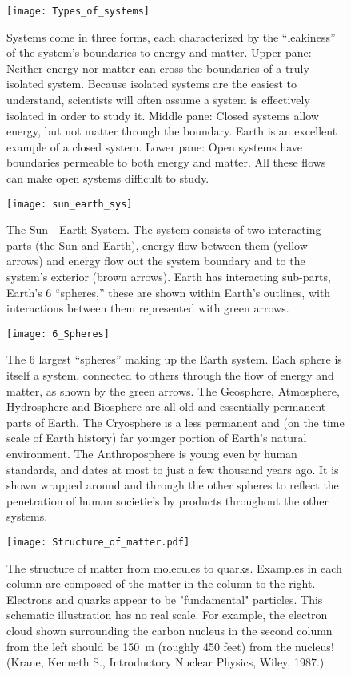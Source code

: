\begin{figure}[p]
\centering
\texttt{[image: Types\_of\_systems]}%
\caption{Systems come in three forms, each characterized by the ``leakiness'' of the system's boundaries to energy and matter. Upper pane: Neither energy nor matter can cross the boundaries of a truly isolated system. Because isolated systems are the easiest to understand, scientists will often assume a system is effectively isolated in order to study it. Middle pane: Closed systems allow energy, but not matter through the boundary. Earth is an excellent example of a closed system. Lower pane: Open systems have boundaries permeable to both energy and matter. All these flows can make open systems difficult to study.}
\label{fig:sys_types}
\end{figure}

\begin{figure}[p]
\centering
\texttt{[image: sun\_earth\_sys]}%
\caption{The Sun---Earth System. The system consists of two interacting parts (the Sun and Earth), energy flow between them (yellow arrows) and energy flow out the system boundary and to the system's exterior (brown arrows). Earth has interacting sub-parts, Earth's 6 ``spheres,'' these are shown within Earth's outlines, with interactions between them represented with green arrows.}
\label{fig:sun_earth_sys}
\end{figure}

\begin{figure}[p]
\centering
\texttt{[image: 6\_Spheres]}%
\caption{The 6 largest ``spheres'' making up the Earth system. Each sphere is itself a system, connected to others through the flow of energy and matter, as shown by the green arrows. The Geosphere, Atmosphere, Hydrosphere and Biosphere are all old and essentially permanent parts of Earth. The Cryosphere is a less  permanent and (on the time scale of Earth  history) far younger portion of Earth's natural environment. The Anthroposphere is young even by human standards, and dates at most to just a few thousand years ago. It is shown wrapped around and through the other spheres to reflect the penetration of human societie's by products throughout the other systems.}
\label{fig:6_spheres}
\end{figure} 

\begin{figure}[p]
\centering
\texttt{[image: Structure\_of\_matter.pdf]}%
\caption{The structure of matter from molecules to quarks. Examples in each column are composed of the matter in the column to the right. Electrons and quarks appear to be "fundamental" particles. This schematic illustration has no real scale. For example, the electron cloud shown surrounding the carbon nucleus in the second column from the left should be \SI{150}{m} (roughly 450 feet) from the nucleus! (Krane, Kenneth S., Introductory Nuclear Physics, Wiley, 1987.) }
\label{fig:matter_struct}
\end{figure}

